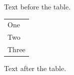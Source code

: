 \documentclass[12pt]{article}
\begin{document}
Text before the table.

\begin{tabular}{l}One\\[-3pt]Two\\Three\end{tabular}

Text after the table.
\end{document}
